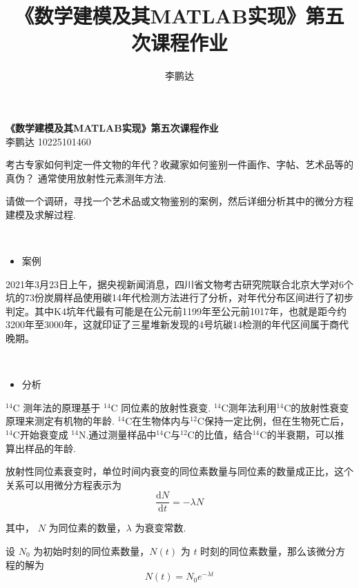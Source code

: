 \documentclass{article}
\begin{document}
\newcommand{\titem}[1]{
~\\
\begin{itemize}
    \item \heiti \large {#1}
\end{itemize}
}

\newcommand{\bb}[1]{{\heiti {#1}}}

\renewcommand{\d}{\mathrm{d}}

\newcommand{\cf}[1]{$^{#1}\textrm{C}$}

\title{《数学建模及其MATLAB实现》第五次课程作业}
\author{李鹏达}
    

\begin{center}
    \LARGE \textbf{\heiti 《数学建模及其{\timesfont MATLAB}实现》第五次课程作业} \\[0.5em]
    \large 李鹏达 10225101460
\end{center}

考古专家如何判定一件文物的年代？收藏家如何鉴别一件画作、字帖、艺术品等的真伪？
通常使用放射性元素测年方法.

请做一个调研，寻找一个艺术品或文物鉴别的案例，然后详细分析其中的微分方程建模及求解过程.

\titem{案例}

2021年3月23日上午，据央视新闻消息，四川省文物考古研究院联合北京大学对6个坑的73份炭屑样品使用碳14年代检测方法进行了分析，对年代分布区间进行了初步判定。其中K4坑年代最有可能是在公元前1199年至公元前1017年，也就是距今约3200年至3000年，这就印证了三星堆新发现的4号坑碳14检测的年代区间属于商代晚期。

\titem{分析}

\cf{14} 测年法的原理基于 \cf{14} 同位素的放射性衰变. \cf{14}测年法利用\cf{14}的放射性衰变原理来测定有机物的年龄. \cf{14}在生物体内与\cf{12}保持一定比例，但在生物死亡后，\cf{14}开始衰变成 $^{14}\textrm{N}$.通过测量样品中\cf{14}与\cf{12}的比值，结合\cf{14}的半衰期，可以推算出样品的年龄.

放射性同位素衰变时，单位时间内衰变的同位素数量与同位素的数量成正比，这个关系可以用微分方程表示为
\begin{equation*}
    \frac{\d N}{\d t} = -\lambda N
\end{equation*}

其中， $N$ 为同位素的数量，$\lambda$ 为衰变常数.

设 $N_0$ 为初始时刻的同位素数量，$N(t)$ 为 $t$ 时刻的同位素数量，那么该微分方程的解为
\begin{equation*}
    N(t) = N_0 e^{-\lambda t}
\end{equation*}
\end{document}
